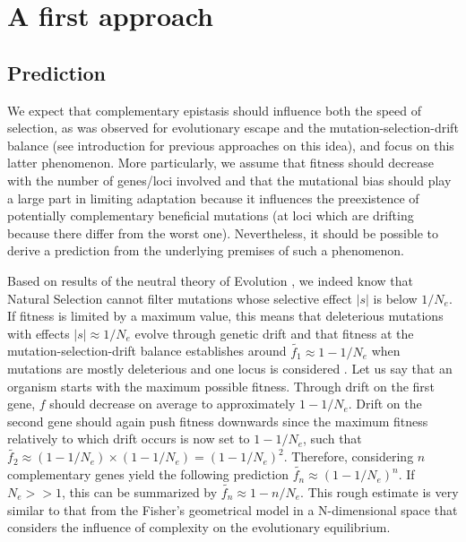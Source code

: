 \documentclass[11pt,onecolumn]{article}
\begin{document}
\section{{A first approach}\label{sec:FA}}

\subsection{Prediction}

We expect that complementary epistasis should influence both the speed of selection, as was observed for evolutionary escape \citep{Weinreich05,Weissman09} and the mutation-selection-drift balance (see introduction for previous approaches on this idea), and focus on this latter phenomenon. More particularly, we assume that fitness should decrease with the number of genes/loci involved and that the mutational bias should play a large part in limiting adaptation because it influences the preexistence of potentially complementary beneficial mutations (at loci which are drifting because there differ from the worst one). Nevertheless, it should be possible to derive a prediction from the underlying premises of such a phenomenon.

Based on results of the neutral theory of Evolution \citep{Kimura62,Ohta73}, we indeed know that Natural Selection cannot filter mutations whose selective effect $|s|$ is below $1/N_e$. If fitness is limited by a maximum value, this means that deleterious mutations with effects $|s|\approx 1/N_e$ evolve through genetic drift and that fitness at the mutation-selection-drift balance establishes around $\widetilde{f_1}\approx 1-1/N_e$ when mutations are mostly deleterious and one locus is considered \citep{Kimura58}. Let us say that an organism starts with the maximum possible fitness. Through drift on the first gene, $f$ should decrease on average to approximately $1-1/N_e$. Drift on the second gene should again push fitness downwards since the maximum fitness relatively to which drift occurs is now set to $1-1/N_e$, such that $\widetilde{f_2}\approx (1-1/N_e)\times (1-1/N_e)=(1-1/N_e)^2$. Therefore, considering $n$ complementary genes yield the following prediction $\widetilde{f_n}\approx (1-1/N_e)^n$. If $N_e>>1$, this can be summarized by $\widetilde{f_n}\approx 1-n/N_e$. This rough estimate is very similar to that from the Fisher's geometrical model in a N-dimensional space \citep{Hartl96,Poon00} that considers the influence of complexity on the evolutionary equilibrium.%
\end{document}
